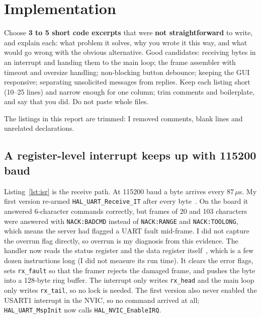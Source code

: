 \section{Implementation}
\label{sec:impl}

\begin{guidance}
Choose \textbf{3 to 5 short code excerpts} that were \textbf{not straightforward}
to write, and explain each: what problem it solves, why you wrote it this way,
and what would go wrong with the obvious alternative. Good candidates:
receiving bytes in an interrupt and handing them to the main loop; the frame
assembler with timeout and oversize handling; non-blocking button debounce;
keeping the GUI responsive; separating unsolicited messages from replies.
Keep each listing short (10--25 lines) and narrow enough for one column; trim
comments and boilerplate, and say that you did. Do not paste whole files.
\end{guidance}

The listings in this report are trimmed: I removed comments, blank lines and
unrelated declarations.

\subsection{A register-level interrupt keeps up with 115200 baud}
Listing~\ref{lst:isr} is the receive path. At 115200 baud a byte arrives every
87\,$\mu$s. My first version re-armed \texttt{HAL\_UART\_Receive\_IT} after every
byte~\cite{um1785}. On the board it answered 6-character commands correctly,
but frames of 20 and 103 characters were answered with \texttt{NACK:BADCMD}
instead of \texttt{NACK:RANGE} and \texttt{NACK:TOOLONG}, which means the
server had flagged a UART fault mid-frame. I did not capture the overrun flag
directly, so overrun is my diagnosis from this evidence. The handler now reads
the status register and the data register itself~\cite{rm0091}, which is a few
dozen instructions long (I did not measure its run time). It clears the error flags, sets \texttt{rx\_fault}
so that the framer rejects the damaged frame, and pushes the byte into a
128-byte ring buffer. The interrupt only writes \texttt{rx\_head} and the main
loop only writes \texttt{rx\_tail}, so no lock is needed. The first version
also never enabled the USART1 interrupt in the NVIC, so no command arrived at
all; \texttt{HAL\_UART\_MspInit} now calls \texttt{HAL\_NVIC\_EnableIRQ}.

